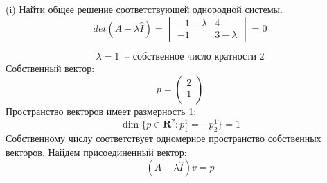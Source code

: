 \documentclass[a4paper, 12pt]{article}
\begin{document}
(i) Найти общее решение соответствующей однородной системы.
\[det(A-\lambda \hat{I})=
\begin{vmatrix}
-1-\lambda & 4 \\
-1 & 3-\lambda
\end{vmatrix}
=0\]


\[\lambda =1\;\;\text{-- собственное число кратности 2}\]
Собственный вектор:
\[p=
\left(
\begin{array}{cc}
2\\
1\\
\end{array}
\right)
\]
Пространство векторов имеет размерность 1:
\[\dim \{ p\in \textbf {R}^2: p_1^1=-p_2^1\}=1\]
Собственному числу соответствует одномерное пространство собственных векторов. Найдем присоединенный вектор:\\
\[(A-\lambda \hat{I})v=p\]
\end{document}
